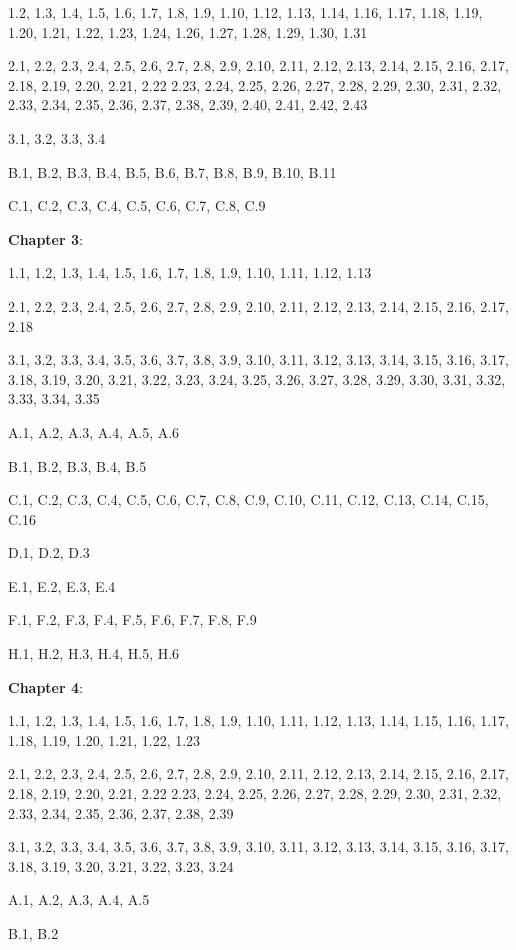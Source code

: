 \documentclass{article}
\begin{document}
1.2, 1.3, 1.4, 1.5, 1.6, 1.7, 1.8, 1.9, 1.10, 1.12, 1.13, 1.14, 1.16, 1.17, 1.18, 1.19, 1.20, 1.21, 1.22, 1.23, 1.24, 1.26, 1.27, 1.28, 1.29, 1.30, 1.31

2.1, 2.2, 2.3, 2.4, 2.5, 2.6, 2.7, 2.8, 2.9, 2.10, 2.11, 2.12, 2.13, 2.14, 2.15, 2.16, 2.17, 2.18, 2.19, 2.20, 2.21, 2.22 2.23, 2.24, 2.25, 2.26, 2.27, 2.28, 2.29, 2.30, 2.31, 2.32, 2.33, 2.34, 2.35, 2.36, 2.37, 2.38, 2.39, 2.40, 2.41, 2.42, 2.43

3.1, 3.2, 3.3, 3.4

B.1, B.2, B.3, B.4, B.5, B.6, B.7, B.8, B.9, B.10, B.11

C.1, C.2, C.3, C.4, C.5, C.6, C.7, C.8, C.9
\medskip

\textbf{Chapter 3}:
\medskip

1.1, 1.2, 1.3, 1.4, 1.5, 1.6, 1.7, 1.8, 1.9, 1.10, 1.11, 1.12, 1.13

2.1, 2.2, 2.3, 2.4, 2.5, 2.6, 2.7, 2.8, 2.9, 2.10, 2.11, 2.12, 2.13, 2.14, 2.15, 2.16, 2.17, 2.18

3.1, 3.2, 3.3, 3.4, 3.5, 3.6, 3.7, 3.8, 3.9, 3.10, 3.11, 3.12, 3.13, 3.14, 3.15, 3.16, 3.17, 3.18, 3.19, 3.20, 3.21, 3.22, 3.23, 3.24, 3.25, 3.26, 3.27, 3.28, 3.29, 3.30, 3.31, 3.32, 3.33, 3.34, 3.35

A.1, A.2, A.3, A.4, A.5, A.6

B.1, B.2, B.3, B.4, B.5

C.1, C.2, C.3, C.4, C.5, C.6, C.7, C.8, C.9, C.10, C.11, C.12, C.13, C.14, C.15, C.16

D.1, D.2, D.3

E.1, E.2, E.3, E.4

F.1, F.2, F.3, F.4, F.5, F.6, F.7, F.8, F.9

H.1, H.2, H.3, H.4, H.5, H.6
\medskip

\textbf{Chapter 4}:
\medskip

1.1, 1.2, 1.3, 1.4, 1.5, 1.6, 1.7, 1.8, 1.9, 1.10, 1.11, 1.12, 1.13, 1.14, 1.15, 1.16, 1.17, 1.18, 1.19, 1.20, 1.21, 1.22, 1.23

2.1, 2.2, 2.3, 2.4, 2.5, 2.6, 2.7, 2.8, 2.9, 2.10, 2.11, 2.12, 2.13, 2.14, 2.15, 2.16, 2.17, 2.18, 2.19, 2.20, 2.21, 2.22 2.23, 2.24, 2.25, 2.26, 2.27, 2.28, 2.29, 2.30, 2.31, 2.32, 2.33, 2.34, 2.35, 2.36, 2.37, 2.38, 2.39

3.1, 3.2, 3.3, 3.4, 3.5, 3.6, 3.7, 3.8, 3.9, 3.10, 3.11, 3.12, 3.13, 3.14, 3.15, 3.16, 3.17, 3.18, 3.19, 3.20, 3.21, 3.22, 3.23, 3.24

A.1, A.2, A.3, A.4, A.5

B.1, B.2
\end{document}
